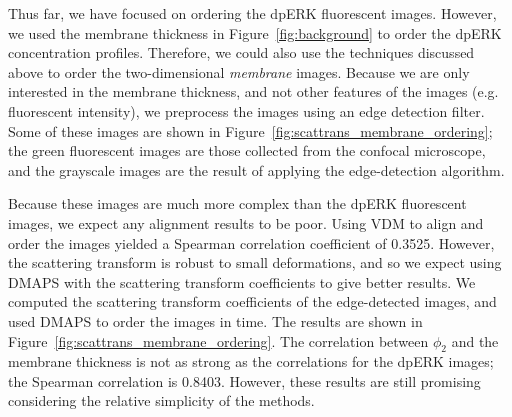 \documentclass[10pt]{article}
\begin{document}
Thus far, we have focused on ordering the dpERK fluorescent images. 
%
However, we used the membrane thickness in Figure~\ref{fig:background} to order the dpERK concentration profiles. 
%
Therefore, we could also use the techniques discussed above to order the two-dimensional {\em membrane} images.
%
Because we are only interested in the membrane thickness, and not other features of the images (e.g. fluorescent intensity), we preprocess the images using an edge detection filter.
%
Some of these images are shown in Figure~\ref{fig:scattrans_membrane_ordering}; the green fluorescent images are those collected from the confocal microscope, and the grayscale images are the result of applying the edge-detection algorithm. 

Because these images are much more complex than the dpERK fluorescent images, we expect any alignment results to be poor.
%
Using VDM to align and order the images yielded a Spearman correlation coefficient of 0.3525.
%
However, the scattering transform is robust to small deformations, and so we expect using DMAPS with the scattering transform coefficients to give better results.
%
We computed the scattering transform coefficients of the edge-detected images, and used DMAPS to order the images in time. 
%
The results are shown in Figure~\ref{fig:scattrans_membrane_ordering}.
%
The correlation between $\phi_2$ and the membrane thickness is not as strong as the correlations for the dpERK images; the Spearman correlation is 0.8403.
%
However, these results are still promising considering the relative simplicity of the methods. 
%
\end{document}

